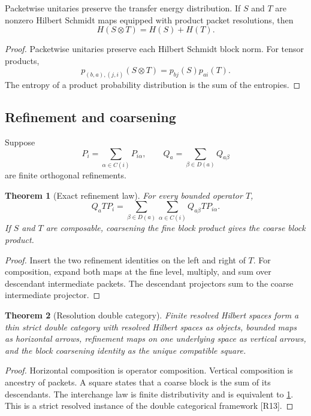 \documentclass{aomart}
\newtheorem{theorem}{Theorem}[section]
\theoremstyle{definition}
\theoremstyle{remark}
\newcommand{\Rcite}[1]{\textup{[#1]}}
\begin{document}
\begin{proposition}\label{prop:entropy_properties}
Packetwise unitaries preserve the transfer energy distribution. If \(S\) and \(T\) are nonzero Hilbert Schmidt maps equipped with product packet resolutions, then
\[
 H(S\otimes T)=H(S)+H(T).
\]
\end{proposition}

\begin{proof}
Packetwise unitaries preserve each Hilbert Schmidt block norm. For tensor products,
\[
 p_{(b,a),(j,i)}(S\otimes T)
 =
 p_{bj}(S)p_{ai}(T).
\]
The entropy of a product probability distribution is the sum of the entropies.
\end{proof}

\subsection{Refinement and coarsening}

Suppose
\[
 P_i=\sum_{\alpha\in C(i)}P_{i\alpha},
 \qquad
 Q_a=\sum_{\beta\in D(a)}Q_{a\beta}
\]
are finite orthogonal refinements.

\begin{theorem}[Exact refinement law]\label{thm:exact_refinement}
For every bounded operator \(T\),
\[
 \boxed{
 Q_aTP_i
 =
 \sum_{\beta\in D(a)}
 \sum_{\alpha\in C(i)}
 Q_{a\beta}TP_{i\alpha}.
 }
\]
If \(S\) and \(T\) are composable, coarsening the fine block product gives the coarse block product.
\end{theorem}

\begin{proof}
Insert the two refinement identities on the left and right of \(T\). For composition, expand both maps at the fine level, multiply, and sum over descendant intermediate packets. The descendant projectors sum to the coarse intermediate projector.
\end{proof}

\begin{theorem}[Resolution double category]\label{thm:double_category}
Finite resolved Hilbert spaces form a thin strict double category with resolved Hilbert spaces as objects, bounded maps as horizontal arrows, refinement maps on one underlying space as vertical arrows, and the block coarsening identity as the unique compatible square.
\end{theorem}

\begin{proof}
Horizontal composition is operator composition. Vertical composition is ancestry of packets. A square states that a coarse block is the sum of its descendants. The interchange law is finite distributivity and is equivalent to \cref{thm:exact_refinement}. This is a strict resolved instance of the double categorical framework \Rcite{R13}.
\end{proof}
\end{document}
